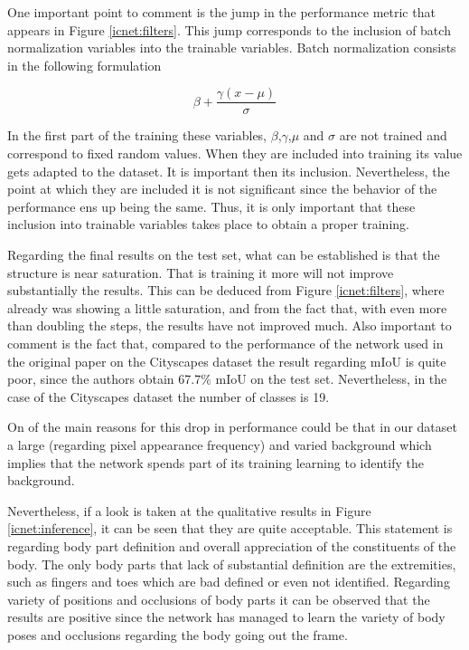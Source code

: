 One important point to comment is the jump in the performance metric that appears in Figure \ref{icnet:filters}. This jump corresponds to the inclusion of batch normalization variables into the trainable variables. Batch normalization consists in the following formulation\newline

\begin{equation}
\beta +\frac{\gamma(x-\mu)}{\sigma}
\end{equation}

In the first part of the training these variables, $\beta$,$\gamma$,$\mu$ and $\sigma$ are not trained and correspond to fixed random values. When they are included into training its value gets adapted to the dataset. It is important then its inclusion. Nevertheless, the point at which they are included it is not significant since the behavior of the performance ens up being the same. Thus, it is only important that these inclusion into trainable variables takes place to obtain a proper training.\newline 

Regarding the final results on the test set, what can be established is that the structure is near saturation. That is training it more will not improve substantially the results. This can be deduced from Figure \ref{icnet:filters}, where already was showing a little saturation, and from the fact that, with even more than doubling the steps, the results have not improved much. Also important to comment is the fact that, compared to the performance of the network used in the original paper on the Cityscapes dataset \parencite{Reference23} the result regarding mIoU is quite poor, since the authors obtain 67.7$\%$ mIoU on the test set. Nevertheless, in the case of the Cityscapes dataset the number of classes is 19.\newline

On of the main reasons for this drop in performance could be that in our dataset a large (regarding pixel appearance frequency) and varied background which implies that the network spends part of its training learning to identify the background.\newline

Nevertheless, if a look is taken at the qualitative results in Figure \ref{icnet:inference}, it can be seen that they are quite acceptable. This statement is regarding body part definition and overall appreciation of the  constituents of the body. The only body parts that lack of substantial definition are the extremities, such as fingers and toes which are bad defined or even not identified. Regarding variety of positions and occlusions of  body parts it can be observed that the results are positive since the network has managed to learn the variety of body poses and occlusions regarding the body going out the frame.\newline

